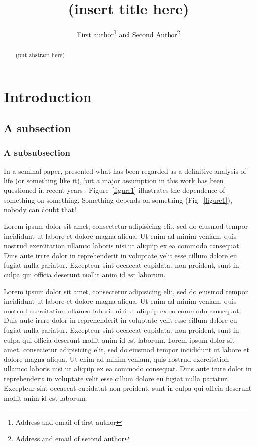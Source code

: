 \documentclass[12pt,titlepage]{article}
\title{(insert title here)}
\author{First author\footnote{Address and email of first author} and Second Author\footnote{Address and email of second author}}
\date{}
\begin{document}
\maketitle

\begin{abstract}
(put abstract here)
\end{abstract}

\section{Introduction}

\subsection{A subsection}
\subsubsection{A subsubsection}

In a seminal paper, \cite{Pants+Friend:1908} presented what has been
regarded as a definitive analysis of life (or something like it), but
a major assumption in this work has been questioned in recent years
\cite[]{Smarter:2008}. Figure~\ref{figure1} illustrates the dependence
of something on something.  Something depends on something
(Fig.~\ref{figure1}), nobody can doubt that!

Lorem ipsum dolor sit amet, consectetur adipisicing elit, sed do
eiusmod tempor incididunt ut labore et dolore magna aliqua. Ut enim ad
minim veniam, quis nostrud exercitation ullamco laboris nisi ut
aliquip ex ea commodo consequat. Duis aute irure dolor in
reprehenderit in voluptate velit esse cillum dolore eu fugiat nulla
pariatur.  Excepteur sint occaecat cupidatat non proident, sunt in
culpa qui officia deserunt mollit anim id est laborum.


Lorem ipsum dolor sit amet, consectetur adipisicing elit, sed do eiusmod tempor
incididunt ut labore et dolore magna aliqua. Ut enim ad minim veniam, quis nostrud
exercitation ullamco laboris nisi ut aliquip ex ea commodo consequat. Duis aute irure
dolor in reprehenderit in voluptate velit esse cillum dolore eu fugiat nulla pariatur.
Excepteur sint occaecat cupidatat non proident, sunt in culpa qui officia deserunt
mollit anim id est laborum. Lorem ipsum dolor sit amet, consectetur adipisicing elit,
sed do eiusmod tempor incididunt ut labore et dolore magna aliqua. Ut enim ad minim
veniam, quis nostrud exercitation ullamco laboris nisi ut aliquip ex ea commodo
consequat. Duis aute irure dolor in reprehenderit in voluptate velit esse cillum
dolore eu fugiat nulla pariatur. Excepteur sint occaecat cupidatat non proident, sunt
in culpa qui officia deserunt mollit anim id est laborum.
\end{document}
